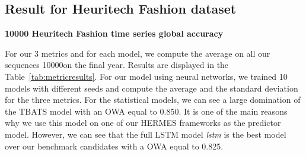 \documentclass{article} %
\newcommand{\numberts}{10000}
\begin{document}










\subsection{Result for Heuritech Fashion dataset}





\textbf{10000 Heuritech Fashion time series global accuracy}

For our 3 metrics and for each model, we compute the average on all our sequences \numberts on the final year. Results are displayed in the Table~\ref{tab:metricresults}. For our model using neural networks, we trained 10 models with different seeds and compute the average and the standard deviation for the three metrics. For the statistical models, we can see a large domination of the TBATS model with an OWA equal to 0.850. It is one of the main reasons why we use this model on one of our HERMES frameworks as the predictor model. However, we can see that the full LSTM model \textit{lstm} is the best model over our benchmark candidates with a OWA equal to 0.825.
\end{document}
